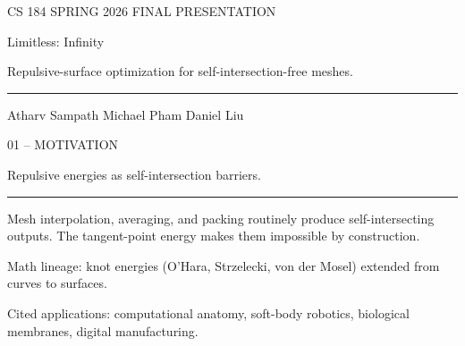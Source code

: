 \documentclass[aspectratio=169,14pt]{beamer}
\newcommand{\decklabel}[1]{%
  {\fontsize{8.5}{11}\selectfont\color{Label}\MakeUppercase{#1}\par}%
}
\newcommand{\slidetitle}[1]{%
  {\fontsize{25}{30}\selectfont\color{Text}\raggedright #1\par}%
}
\newcommand{\slidebody}[1]{%
  {\fontsize{12.2}{15.4}\selectfont\color{Dim}\raggedright #1\par}%
}
\newcommand{\tinynote}[1]{%
  {\fontsize{8.5}{10}\selectfont\color{Label}#1\par}%
}
\newcommand{\thinrule}{%
  \par\vspace{0.24cm}%
  {\color{Rule}\rule{2.45cm}{0.35pt}}%
  \par\vspace{0.25cm}%
}
\begin{document}
\begin{frame}[plain]
  \vspace*{0.72cm}
  \hspace*{1.22cm}
  \begin{minipage}{0.82\paperwidth}
    \raggedright
    \decklabel{CS 184 \textperiodcentered{} Spring 2026 \textperiodcentered{} Final Presentation}
    \vspace{0.62cm}

    {\fontsize{37}{44}\selectfont\color{Text}Limitless: Infinity\par}
    \vspace{0.25cm}
    {\fontsize{15.6}{20}\selectfont\color{Dim}Repulsive-surface optimization for self-intersection-free meshes.\par}
    \vspace{0.46cm}
    \textcolor{Rule}{\rule{2.45cm}{0.35pt}}
    \vspace{0.26cm}

    {\fontsize{9.5}{12}\selectfont\color{Label}
    Atharv Sampath \quad \textperiodcentered{} \quad Michael Pham
    \quad \textperiodcentered{} \quad Daniel Liu\par}
  \end{minipage}
\end{frame}

\begin{frame}[plain]
  \vspace*{0.82cm}
  \hspace*{1.22cm}
  \begin{minipage}{0.80\paperwidth}
  \raggedright
  \decklabel{01 -- Motivation}
  \vspace{0.54cm}
  \slidetitle{Repulsive energies as self-intersection barriers.}
  \thinrule
  \slidebody{Mesh interpolation, averaging, and packing routinely produce self-intersecting outputs. The tangent-point energy makes them impossible by construction.}
  \vspace{0.30cm}
  \tinynote{Math lineage: knot energies (O'Hara, Strzelecki, von der Mosel) extended from curves to surfaces.}
  \vspace{0.10cm}
  \tinynote{Cited applications: computational anatomy, soft-body robotics, biological membranes, digital manufacturing.}
  \end{minipage}
\end{frame}
\end{document}
